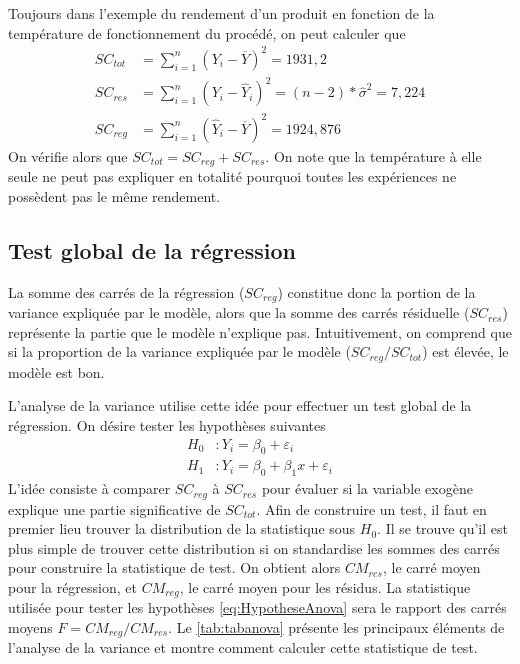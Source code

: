 
\begin{exemple}
\label{exp:ss}
Toujours dans l'exemple du rendement d'un produit en fonction de la température de fonctionnement du procédé, on peut calculer que
{\small
\begin{align*}
SC_{tot} &= \sum_{i=1}^n(Y_i-\overline{Y})^2 = 1931,2 \\
SC_{res} &= \sum_{i=1}^n(Y_i-\hat{Y}_i)^2 = (n-2)*\hat\sigma^2 = 7,224 \\
SC_{reg} &= \sum_{i=1}^n(\hat{Y}_i-\overline{Y})^2 = 1924,876
\end{align*}
}
On vérifie alors que $SC_{tot} = SC_{reg} + SC_{res}$. On note que la température \`a elle seule ne peut pas expliquer en totalit\'e pourquoi toutes les expériences ne possèdent pas le m\^eme rendement.
\end{exemple}

\subsection{Test global de la régression}

La somme des carrés de la régression ($SC_{reg}$) constitue donc la portion de la variance expliquée par le modèle, alors que la somme des carrés résiduelle ($SC_{res}$) représente la partie que le modèle n'explique pas. Intuitivement, on comprend que si la proportion de la variance expliquée par le modèle ($SC_{reg}/SC_{tot}$) est élevée, le modèle est bon.

L'analyse de la variance utilise cette idée pour effectuer un test global de la régression. On désire tester les hypothèses suivantes
\begin{align}
H_0&:Y_i=\beta_0+\varepsilon_i \nonumber \\
H_1&:Y_i=\beta_0+\beta_1x+\varepsilon_i  \label{eq:HypotheseAnova}
\end{align}
L'idée consiste à comparer $SC_{reg}$ à $SC_{res}$ pour évaluer si la variable exogène explique une partie significative de $SC_{tot}$. Afin de construire un test, il faut en premier lieu trouver la distribution de la statistique sous $H_0$. Il se trouve qu'il est plus simple de trouver cette distribution si on standardise les sommes des carrés pour construire la statistique de test. On obtient alors $CM_{res}$, le carré moyen pour la régression, et $CM_{reg}$, le carré moyen pour les résidus. La statistique utilisée pour tester les hypothèses \ref{eq:HypotheseAnova} sera le rapport des carrés moyens $F = CM_{reg}/CM_{res}$. Le \autoref{tab:tabanova} présente les principaux éléments de l'analyse de la variance et montre comment calculer cette statistique de test.

